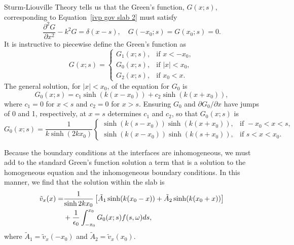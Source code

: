 \documentclass[12pt]{../style-files/ociamthesis}
\begin{document}
Sturm-Liouville Theory tells us that the Green's function, $G(x;s)$, corresponding to Equation~\eqref{ivp gov slab 2} must satisfy 
\begin{equation}
\frac{\partial^2G}{\partial x^2} - k^2 G = \delta(x - s), \quad G(-x_0; s) = G(x_0; s) = 0.
\end{equation}
It is instructive to piecewise define the Green's function as
\begin{equation}
G(x; s) = 
\begin{cases}
G_1(x; s), & \text{if } x < -x_0, \\
G_0(x; s), & \text{if } |x| < x_0, \\
G_2(x; s), & \text{if } x_0 < x.
\end{cases}
\end{equation}
The general solution, for $|x| < x_0$, of the equation for $G_0$ is
\begin{equation}
G_0(x; s) = c_1\sinh(k(x - x_0)) + c_2\sinh(k(x + x_0)),
\end{equation}
where $c_1 = 0$ for $x < s$ and $c_2 = 0$ for $x > s$. Ensuring $G_0$ and $\partial G_0 / \partial x$ have jumps of 0 and 1, respectively, at $x = s$  determines $c_1$ and $c_2$, so that $G_0(x;s)$ is
\begin{equation}
G_0(x;s) = \frac{1}{k\sinh(2k x_0)}
\begin{cases}
\sinh(k(s - x_0))\sinh(k(x + x_0)), & \text{if } -x_0<x<s, \\
\sinh(k(x - x_0))\sinh(k(s + x_0)), & \text{if } s<x<x_0.
\end{cases}
\end{equation}

Because the boundary conditions at the interfaces are inhomogeneous, we must add to the standard Green's function solution a term that is a solution to the homogeneous equation and the inhomogeneous boundary conditions. In this manner, we find that the solution within the slab is
\begin{align}
\tilde{v}_x(x) = &\frac{1}{\sinh{2kx_0}} \left[ \tilde{A}_1\sinh(k(x_0 - x)) + \tilde{A}_2\sinh(k(x_0 + x)) \right] \notag \\
&+ \frac{1}{\epsilon_0}\int_{-x_0}^{x_0} G_0(x;s) f(s, \omega) ds,
\label{sol 0}
\end{align}
where $\tilde{A}_1 = \tilde{v}_x(-x_0)$ and $\tilde{A}_2 = \tilde{v}_x(x_0)$.
\end{document}
